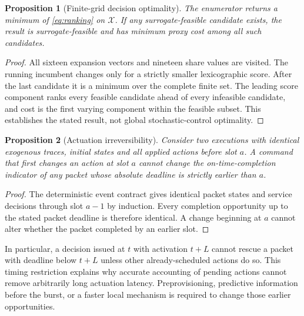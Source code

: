 \documentclass{IEEEoj}
\newtheorem{proposition}{Proposition}
\begin{document}
\begin{proposition}[Finite-grid decision optimality]
The enumerator returns a minimum of \eqref{eq:ranking} on $\mathcal X$.
If any surrogate-feasible candidate exists, the result is surrogate-feasible
and has minimum proxy cost among all such candidates.
\end{proposition}
\begin{proof}
All sixteen expansion vectors and nineteen share values are visited. The
running incumbent changes only for a strictly smaller lexicographic score.
After the last candidate it is a minimum over the complete finite set. The
leading score component ranks every feasible candidate ahead of every infeasible
candidate, and cost is the first varying component within the feasible subset.
This establishes the stated result, not global stochastic-control optimality.
\end{proof}


\begin{proposition}[Actuation irreversibility]
Consider two executions with identical exogenous traces, initial states and
all applied actions before slot $a$. A command that first changes an action
at slot $a$ cannot change the on-time-completion indicator of any packet whose
absolute deadline is strictly earlier than $a$.
\end{proposition}
\begin{proof}
The deterministic event contract gives identical packet states and service
decisions through slot $a-1$ by induction. Every completion opportunity up to
the stated packet deadline is therefore identical. A change beginning at
$a$ cannot alter whether the packet completed by an earlier slot.
\end{proof}
In particular, a decision issued at $t$ with activation $t+L$ cannot rescue a
packet with deadline below $t+L$ unless other already-scheduled actions do so.
This timing restriction explains why accurate accounting of pending actions cannot remove arbitrarily long actuation latency. Preprovisioning, predictive information before the burst,
or a faster local mechanism is required to change those earlier opportunities.
\end{document}
